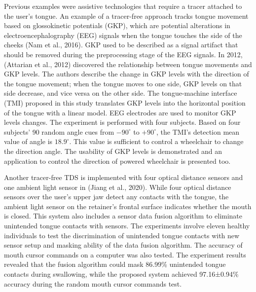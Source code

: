 Previous examples were assistive technologies that require a tracer attached to the user's tongue. An example of a tracer-free approach tracks tongue movement based on glossokinetic potentials (GKP), which are potential alterations in electroencephalography (EEG) signals when the tongue touches the side of the cheeks (Nam et al., 2016). GKP used to be described as a signal artifact that should be removed during the preprocessing stage of the EEG signals. In 2012, (Attarian et al., 2012) discovered the relationship between tongue movements and GKP levels. The authors describe the change in GKP levels with the direction of the tongue movement;  when the tongue moves to one side, GKP levels on that side decrease, and vice versa on the other side. The tongue-machine interface (TMI) proposed in this study translates GKP levels into the horizontal position of the tongue with a linear model. EEG electrodes are used to monitor GKP levels changes. The experiment is performed with four subjects. Based on four subjects' 90 random angle cues from $- 90^{\circ}$ to $+ 90^{\circ}$, the TMI's detection mean value of angle is $18.9^{\circ}$. This value is sufficient to control a wheelchair to change the direction angle. The usability of GKP levels is demonstrated and an application to control the direction of powered wheelchair is presented too. %

Another tracer-free TDS is implemented with four optical distance sensors and one ambient light sensor in (Jiang et al., 2020). While four optical distance sensors over the user's upper jaw detect any contacts with the tongue, the ambient light sensor on the retainer's frontal surface  indicates whether the mouth is closed. This system also includes a sensor data fusion algorithm to eliminate unintended tongue contacts with sensors. The experiments involve eleven healthy individuals to test the discrimination of unintended tongue contacts with new sensor setup and masking ability of the data fusion algorithm. The accuracy of mouth cursor commands on a computer was also tested. The experiment results revealed that the fusion algorithm could mask 86.99\% unintended tongue contacts during swallowing, while the proposed system achieved 97.16±0.94\% accuracy during the random mouth cursor commands test. %



